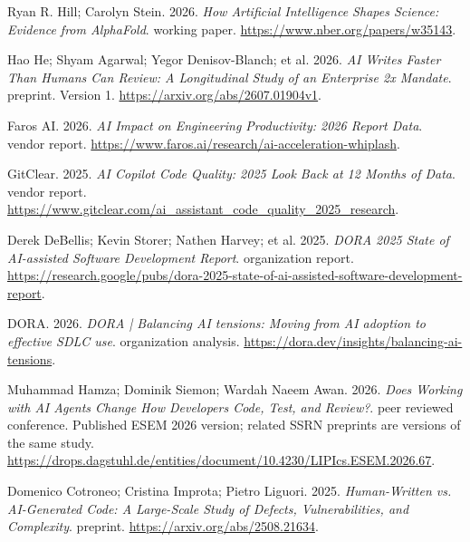 {\begin{description}[leftmargin=2em,labelwidth=1.5em,itemsep=1pt,parsep=0pt]
\item[31.] \hypertarget{ref-alphafoldimpact2026}{} Ryan R. Hill; Carolyn Stein. 2026. \textit{How Artificial Intelligence Shapes Science: Evidence from AlphaFold}. working paper. \url{https://www.nber.org/papers/w35143}.

\item[32.] \hypertarget{ref-hemandate2026}{} Hao He; Shyam Agarwal; Yegor Denisov-Blanch; et al. 2026. \textit{AI Writes Faster Than Humans Can Review: A Longitudinal Study of an Enterprise 2x Mandate}. preprint. Version 1. \url{https://arxiv.org/abs/2607.01904v1}.

\item[33.] \hypertarget{ref-faros2026}{} Faros AI. 2026. \textit{AI Impact on Engineering Productivity: 2026 Report Data}. vendor report. \url{https://www.faros.ai/research/ai-acceleration-whiplash}.

\item[34.] \hypertarget{ref-gitclear2025}{} GitClear. 2025. \textit{AI Copilot Code Quality: 2025 Look Back at 12 Months of Data}. vendor report. \url{https://www.gitclear.com/ai\_assistant\_code\_quality\_2025\_research}.

\item[35.] \hypertarget{ref-dora2025}{} Derek DeBellis; Kevin Storer; Nathen Harvey; et al. 2025. \textit{DORA 2025 State of AI-assisted Software Development Report}. organization report. \url{https://research.google/pubs/dora-2025-state-of-ai-assisted-software-development-report}.

\item[36.] \hypertarget{ref-doratensions2026}{} DORA. 2026. \textit{DORA | Balancing AI tensions: Moving from AI adoption to effective SDLC use}. organization analysis. \url{https://dora.dev/insights/balancing-ai-tensions}.

\item[37.] \hypertarget{ref-hamza2026}{} Muhammad Hamza; Dominik Siemon; Wardah Naeem Awan. 2026. \textit{Does Working with AI Agents Change How Developers Code, Test, and Review?}. peer reviewed conference. Published ESEM 2026 version; related SSRN preprints are versions of the same study. \url{https://drops.dagstuhl.de/entities/document/10.4230/LIPIcs.ESEM.2026.67}.

\item[38.] \hypertarget{ref-cotroneo2025}{} Domenico Cotroneo; Cristina Improta; Pietro Liguori. 2025. \textit{Human-Written vs. AI-Generated Code: A Large-Scale Study of Defects, Vulnerabilities, and Complexity}. preprint. \url{https://arxiv.org/abs/2508.21634}.


\end{description}}
